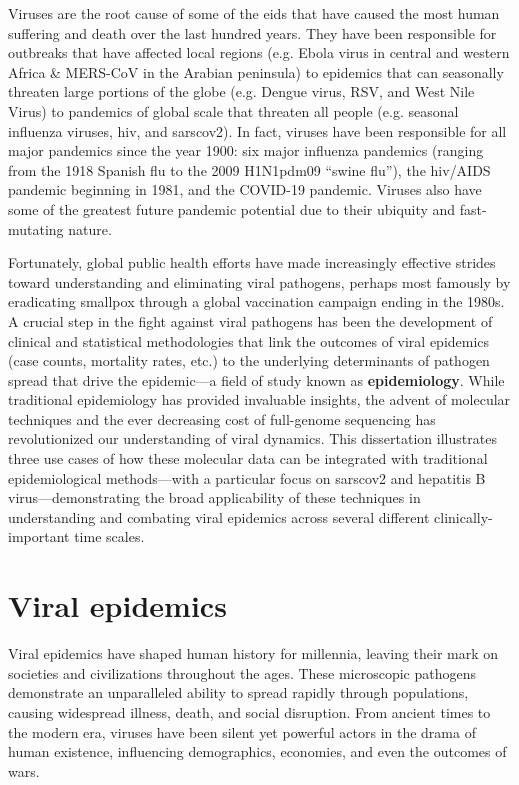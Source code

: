 Viruses are the root cause of some of the \gls{eid}s that have caused the most human suffering and death over the last hundred years.
They have been responsible for outbreaks that have affected local regions (e.g. Ebola virus in central and western Africa \& MERS-CoV in the Arabian peninsula) to epidemics that can seasonally threaten large portions of the globe (e.g. Dengue virus, RSV, and West Nile Virus) to pandemics of global scale that threaten all people (e.g. seasonal influenza viruses, \gls{hiv}, and \gls{sarscov2}).
In fact, viruses have been responsible for all major pandemics since the year 1900: six major influenza pandemics (ranging from the 1918 Spanish flu to the 2009 H1N1pdm09 ``swine flu''), the \gls{hiv}/AIDS pandemic beginning in 1981, and the COVID-19 pandemic.
Viruses also have some of the greatest future pandemic potential due to their ubiquity and fast-mutating nature.

Fortunately, global public health efforts have made increasingly effective strides toward understanding and eliminating viral pathogens, perhaps most famously by eradicating smallpox through a global vaccination campaign ending in the 1980s.
A crucial step in the fight against viral pathogens has been the development of clinical and statistical methodologies that link the outcomes of viral epidemics (case counts, mortality rates, etc.) to the underlying determinants of pathogen spread that drive the epidemic---a field of study known as \textbf{epidemiology}.
While traditional epidemiology has provided invaluable insights, the advent of molecular techniques and the ever decreasing cost of full-genome sequencing has revolutionized our understanding of viral dynamics.
This dissertation illustrates three use cases of how these molecular data can be integrated with traditional epidemiological methods---with a particular focus on \gls{sarscov2} and hepatitis B virus---demonstrating the broad applicability of these techniques in understanding and combating viral epidemics across several different clinically-important time scales.

\section{Viral epidemics}\label{sec:int-viralEpi}
Viral epidemics have shaped human history for millennia, leaving their mark on societies and civilizations throughout the ages.
These microscopic pathogens demonstrate an unparalleled ability to spread rapidly through populations, causing widespread illness, death, and social disruption.
From ancient times to the modern era, viruses have been silent yet powerful actors in the drama of human existence, influencing demographics, economies, and even the outcomes of wars.

